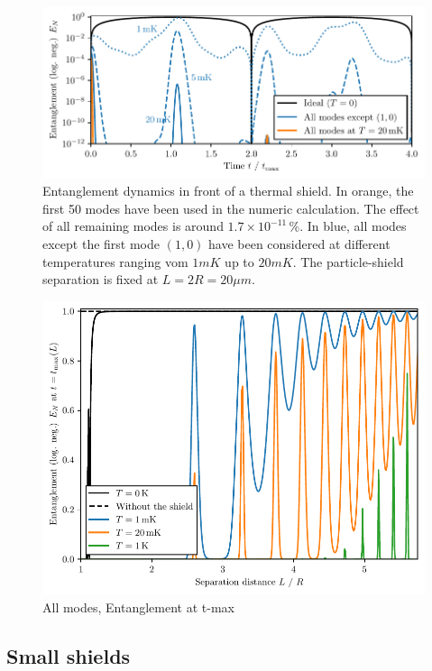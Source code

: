 \begin{figure}[!htbp]
  \centering
  \includegraphics[width=\textwidth]{./../figures/vibrations/entanglement-multiple-modes.pdf}
  \caption{Entanglement dynamics in front of a thermal shield. In orange, the first 50 modes have been used in the numeric calculation. The effect of all remaining modes is around $1.7 \times 10^{-11}\,\%$. In blue, all modes except the first mode $(1,0)$ have been considered at different temperatures ranging vom $1\si{mK}$ up to $20\si{mK}$. The particle-shield separation is fixed at $L = 2R = 20\si{\mu m}$.}
\end{figure}

\begin{figure}[!htbp]
  \centering
  \includegraphics[width=\textwidth]{./../figures/vibrations/all-modes-maximum-entanglement-L-t-max.pdf}
  \caption{All modes, Entanglement at t-max}
\end{figure}


\subsection{Small shields}
